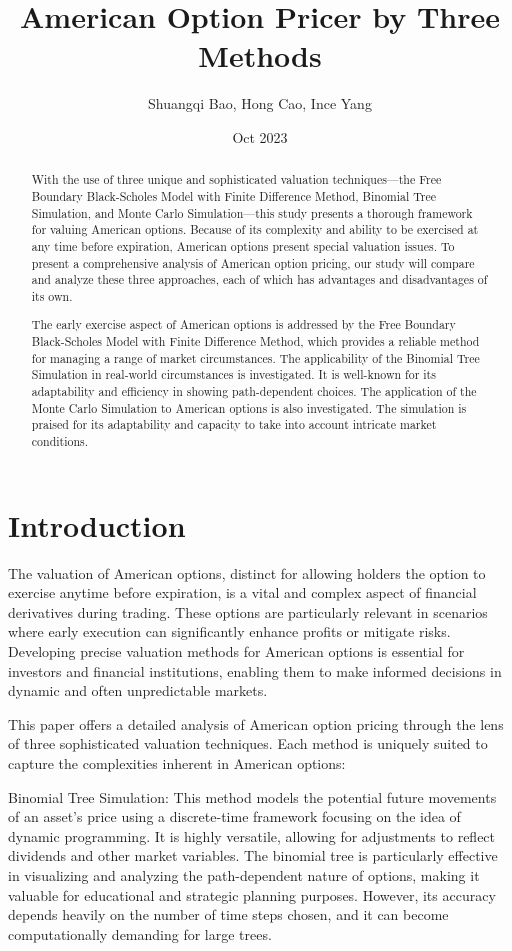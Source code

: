 \documentclass{article}
\title{American Option Pricer by Three Methods}
\author{Shuangqi Bao, Hong Cao, Ince Yang}
\date{Oct 2023}
\begin{document}
\maketitle
\begin{abstract}
With the use of three unique and sophisticated valuation techniques—the Free Boundary Black-Scholes Model with Finite Difference Method, Binomial Tree Simulation, and Monte Carlo Simulation—this study presents a thorough framework for valuing American options. Because of its complexity and ability to be exercised at any time before expiration, American options present special valuation issues. To present a comprehensive analysis of American option pricing, our study will compare and analyze these three approaches, each of which has advantages and disadvantages of its own.

The early exercise aspect of American options is addressed by the Free Boundary Black-Scholes Model with Finite Difference Method, which provides a reliable method for managing a range of market circumstances. The applicability of the Binomial Tree Simulation in real-world circumstances is investigated. It is well-known for its adaptability and efficiency in showing path-dependent choices. The application of the Monte Carlo Simulation to American options is also investigated. The simulation is praised for its adaptability and capacity to take into account intricate market conditions.
\end{abstract}

\section{Introduction}
The valuation of American options, distinct for allowing holders the option to exercise anytime before expiration, is a vital and complex aspect of financial derivatives during trading. These options are particularly relevant in scenarios where early execution can significantly enhance profits or mitigate risks. Developing precise valuation methods for American options is essential for investors and financial institutions, enabling them to make informed decisions in dynamic and often unpredictable markets.

This paper offers a detailed analysis of American option pricing through the lens of three sophisticated valuation techniques. Each method is uniquely suited to capture the complexities inherent in American options:

Binomial Tree Simulation: This method models the potential future movements of an asset's price using a discrete-time framework focusing on the idea of dynamic programming. It is highly versatile, allowing for adjustments to reflect dividends and other market variables. The binomial tree is particularly effective in visualizing and analyzing the path-dependent nature of options, making it valuable for educational and strategic planning purposes. However, its accuracy depends heavily on the number of time steps chosen, and it can become computationally demanding for large trees.
\end{document}
